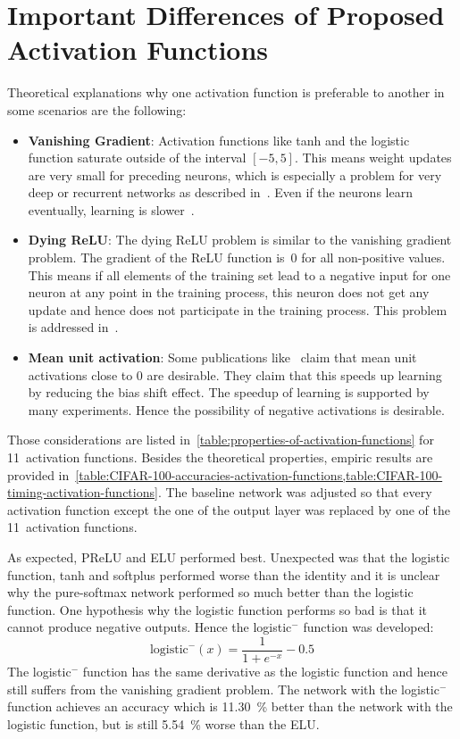 \section{Important Differences of Proposed Activation Functions}
Theoretical explanations why one activation function is preferable to another
in some scenarios are the following:
\begin{itemize}
    \item \textbf{Vanishing Gradient}: Activation functions like tanh and the
          logistic function saturate outside of the interval $[-5, 5]$. This
          means weight updates are very small for preceding neurons, which is
          especially a problem for very deep or recurrent networks as described
          in~\cite{bengio1994learning}. Even if the neurons learn eventually,
          learning is slower~\cite{AlexNet-2012}.
    \item \textbf{Dying ReLU}: The dying \gls{ReLU} problem is similar to the
          vanishing gradient problem. The gradient of the \gls{ReLU} function
          is~0 for all non-positive values. This means if all elements of the
          training set lead to a negative input for one neuron at any point in
          the training process, this neuron does not get any update and hence
          does not participate in the training process. This problem is
          addressed in~\cite{maas2013rectifier}.
    \item \textbf{Mean unit activation}: Some publications
          like~\cite{clevert2015fast,BatchNormalization-2015} claim that mean
          unit activations close to 0 are desirable. They claim that this
          speeds up learning by reducing the bias shift effect. The speedup
          of learning is supported by many experiments. Hence the possibility
          of negative activations is desirable.
\end{itemize}

Those considerations are listed
in~\cref{table:properties-of-activation-functions} for 11~activation functions.
Besides the theoretical properties, empiric results are provided
in~\cref{table:CIFAR-100-accuracies-activation-functions,table:CIFAR-100-timing-activation-functions}.
The baseline network was adjusted so that every activation function except the
one of the output layer was replaced by one of the 11~activation functions.

As expected, \gls{PReLU} and \gls{ELU} performed best. Unexpected was that the
logistic function, tanh and softplus performed worse than the identity and it
is unclear why the pure-softmax network performed so much better than the
logistic function.
One hypothesis why the logistic function performs so bad is that it cannot
produce negative outputs. Hence the logistic$^-$ function was developed:
\[\text{logistic}^{-}(x) = \frac{1}{1+ e^{-x}} - 0.5\]
The logistic$^-$ function has the same derivative as the logistic function and
hence still suffers from the vanishing gradient problem.
The network with the logistic$^-$ function achieves an accuracy which is
\SI{11.30}{\percent} better than the network with the logistic function, but is
still \SI{5.54}{\percent} worse than the \gls{ELU}.

